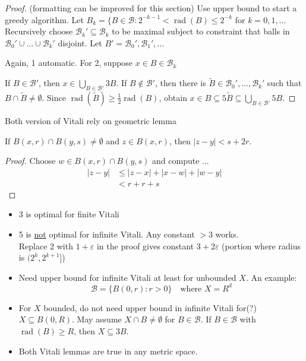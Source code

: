 \begin{proof}
  (formatting can be improved for this section)
  Use upper bound to start a greedy algorithm. Let $B_k = \{ B \in \mathcal{B} : 2^{-k-1} < \operatorname{rad}(B) \leq 2^{-k}$ for $k = 0, 1, \ldots$
    Recursively choose $\mathcal{B}_k' \subseteq \mathcal{B}_k$ to be maximal subject to constraint that balls in $\mathcal{B}_0' \cup \ldots \cup \mathcal{B}_k'$ disjoint.
    Let $B' = \mathcal{B}_0', \mathcal{B}_1', \ldots$


    Again, 1 automatic.
    For 2, suppose $x \in B \in \mathcal{B}_k$

    If $B \in \mathcal{B}'$, then $x \in \bigcup_{B \in \mathcal{B}'} 3B$.
    If $B \notin \mathcal{B}'$, then there is $\tilde{B} \in \mathcal{B}_0', \ldots, \mathcal{B}_k'$ such that $B \cap \tilde{B} \ne \emptyset$.
    Since $\operatorname{rad}(\tilde{B}) \geq \frac{1}{2} \operatorname{rad}(B)$, obtain $x \in B \subseteq 5\tilde{B} \subseteq \bigcup_{B \in \mathcal{B}'} 5B$.
\end{proof}

Both version of Vitali rely on geometric lemma

\begin{lemma}
  If $B(x,r) \cap B(y,s) \ne \emptyset$ and $z \in B(x,r)$, then $|z - y| < s + 2r$.
\end{lemma}

\begin{proof}
  Choose $w \in B(x,r) \cap B(y,s)$ and compute ...
  \begin{align*}
    |z - y| & \leq |z - x| + |x - w| + |w - y| \\
            & < r + r + s
  \end{align*}
\end{proof}

\begin{remark}
  \begin{itemize}
    \item 3 is optimal for finite Vitali
    \item 5 is \underline{not} optimal for infinite Vitali. Any constant $>3$ works. \\
      Replace $2$ with $1 + \varepsilon$ in the proof gives constant $3 + 2\varepsilon$ (portion where radius is $(2^k, 2^{k+1}]$)
    \item Need upper bound for infinite Vitali at least for unbounded $X$. An example:
      \[
        \mathcal{B} = \{B(0,r) : r > 0 \} \quad \text{where } X = R^d
      \]
    \item For $X$ bounded, do not need upper bound in infinite Vitali for(?) $X \subseteq B(0,R)$. May assume $X \cap B \ne \emptyset$ for $B \in \mathcal{B}$.
      If $B \in \mathcal{B}$ with $\operatorname{rad}(B) \geq R$, then $X \subseteq 3B$.
    \item Both Vitali lemmas are true in any metric space.
  \end{itemize}
\end{remark}

